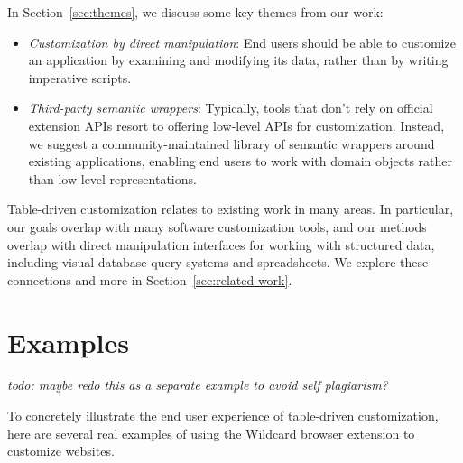 \documentclass[sigplan,10pt,anonymous,review]{acmart}
\providecommand{\tightlist}{%
  \setlength{\itemsep}{0pt}\setlength{\parskip}{0pt}}
\begin{document}
In Section~\ref{sec:themes}, we discuss some key themes from our work:

\begin{itemize}
\tightlist
\item
  \emph{Customization by direct manipulation}: End users should be able
  to customize an application by examining and modifying its data,
  rather than by writing imperative scripts.
\item
  \emph{Third-party semantic wrappers}: Typically, tools that don't rely
  on official extension APIs resort to offering low-level APIs for
  customization. Instead, we suggest a community-maintained library of
  semantic wrappers around existing applications, enabling end users to
  work with domain objects rather than low-level representations.
\end{itemize}

Table-driven customization relates to existing work in many areas. In
particular, our goals overlap with many software customization tools,
and our methods overlap with direct manipulation interfaces for working
with structured data, including visual database query systems and
spreadsheets. We explore these connections and more in
Section~\ref{sec:related-work}.

\hypertarget{sec:examples}{%
\section{Examples}\label{sec:examples}}

\emph{todo: maybe redo this as a separate example to avoid self
plagiarism?}

To concretely illustrate the end user experience of table-driven
customization, here are several real examples of using the Wildcard
browser extension to customize websites.
\end{document}
